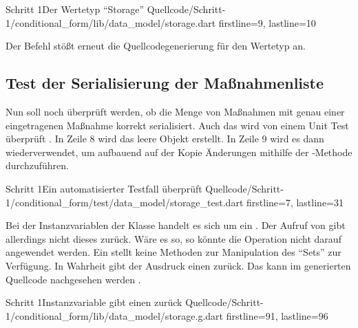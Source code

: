 \begin{alexlisting}{Schritt 1}{Der Wertetyp \enquote{Storage}}
  {Quellcode/Schritt-1/conditional_form/lib/data_model/storage.dart}
  {firstline=9, lastline=10}
  \label{lst:Schritt1WerteTypStorage}
\end{alexlisting}

Der Befehl   stößt erneut die Quellcodegenerierung für den Wertetyp  an.

\subsection{Test der Serialisierung der Maßnahmenliste}

Nun soll noch überprüft werden, ob die Menge von Maßnahmen mit genau einer eingetragenen Maßnahme korrekt serialisiert.
Auch das wird von einem Unit Test überprüft \Lst{\ref{lst:Schritt1MassnahmenSerialisierenOhneFehlerUnitTest}}.
In Zeile 8 wird das leere Objekt  erstellt.
In Zeile 9 wird es dann wiederverwendet, um aufbauend auf der Kopie Änderungen mithilfe der -Methode durchzuführen.

\begin{alexlisting}{Schritt 1}{Ein automatisierter Testfall überprüft}
  {Quellcode/Schritt-1/conditional_form/test/data_model/storage_test.dart}
  {firstline=7, lastline=31}
  \label{lst:Schritt1MassnahmenSerialisierenOhneFehlerUnitTest}
\end{alexlisting}

Bei der Instanzvariablen  der Klasse  handelt es sich um ein .
 Der Aufruf von   gibt allerdings nicht dieses  zurück.
 Wäre es so, so könnte die Operation  nicht  darauf angewendet werden.
 Ein  stellt keine Methoden zur Manipulation des \enquote{Sets} zur Verfügung.
 In Wahrheit gibt der Ausdruck  einen  zurück.
 Das kann im generierten Quellcode nachgesehen werden \LstZ{\ref{lst:Schritt1InstanzvariableMassnahmenGibtEinenSetBuilderZurueck}}.

\begin{alexlisting}{Schritt 1}{Instanzvariable  gibt einen  zurück}
  {Quellcode/Schritt-1/conditional_form/lib/data_model/storage.g.dart}
  {firstline=91, lastline=96}
  \label{lst:Schritt1InstanzvariableMassnahmenGibtEinenSetBuilderZurueck}
\end{alexlisting}


